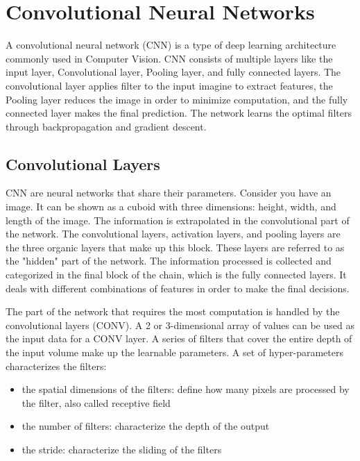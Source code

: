 \section{Convolutional Neural Networks}
A convolutional neural network (CNN) is a type of deep learning architecture commonly used in Computer Vision. 
CNN consists of multiple layers like the input layer, Convolutional layer, Pooling layer, and fully connected layers. 
The convolutional layer applies filter to the input imagine to extract features, the Pooling layer reduces the image in order to minimize computation,
and the fully connected layer makes the final prediction. The network learns the optimal filters through backpropagation and gradient descent. 

\subsection{Convolutional Layers}
%

CNN are neural networks that share their parameters. Consider you have an image. It can be shown as a cuboid with three dimensions: height, width, and length of the image. 
The information is extrapolated in the convolutional part of the network. The convolutional layers, activation layers, and pooling layers are the three organic layers 
that make up this block. These layers are referred to as the "hidden" part of the network.
The information processed is collected and categorized in the final block of the chain, which is the fully connected layers. 
It deals with different combinations of features in order to make the final decisions. 

The part of the network that requires the most computation is handled by the convolutional layers (CONV). A 2 or 3-dimensional array 
of values can be used as the input data for a CONV layer. A series of filters that cover the entire depth of the input volume make up the learnable parameters.
A set of hyper-parameters characterizes the filters: 
\begin{itemize}
    \item the spatial dimensions of the filters: define how many pixels are
    processed by the filter, also called receptive field
    \item the number of filters: characterize the depth of the output
    \item the stride: characterize the sliding of the filters
\end{itemize}






